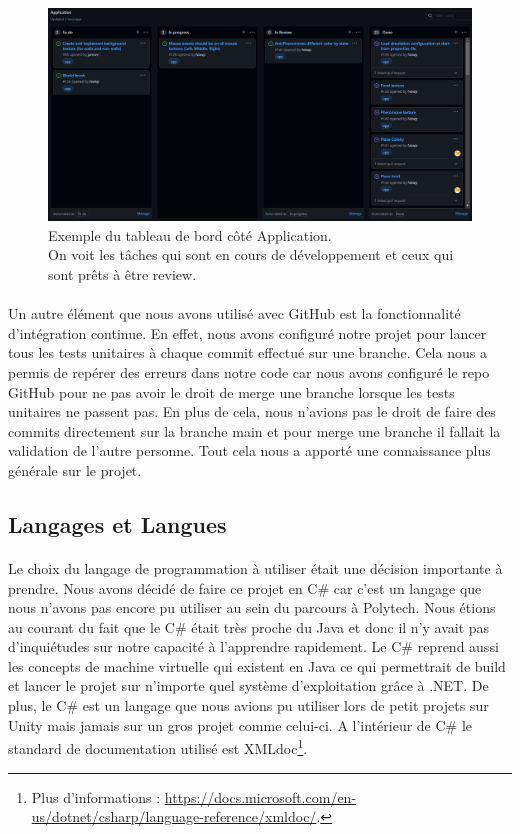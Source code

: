 \documentclass{EPUProjetDi}
\begin{document}
\begin{figure}[h]
\centering
\includegraphics[scale=.3]{kanban.png}
\caption{Exemple du tableau de bord côté Application. 
\\On voit les tâches qui sont en cours de développement et ceux qui sont prêts à être review.}
\label{fig:Kanban}
\end{figure}

\paragraph{}
Un autre élément que nous avons utilisé avec GitHub est la fonctionnalité d'intégration continue. En effet, nous avons configuré notre projet 
pour lancer tous les tests unitaires à chaque commit effectué sur une branche.
Cela nous a permis de repérer des erreurs dans notre code car nous avons configuré le repo GitHub pour ne pas avoir le droit de merge une branche lorsque les tests unitaires ne passent pas.
En plus de cela, nous n'avions pas le droit de faire des commits directement sur la branche main et pour merge une branche il fallait la validation de l'autre personne.
Tout cela nous a apporté une connaissance plus générale sur le projet.

\subsection{Langages et Langues}

\paragraph{}
Le choix du langage de programmation à utiliser était une décision importante à prendre. Nous avons décidé de faire ce projet en C\# car c'est un langage que nous
n'avons pas encore pu utiliser au sein du parcours à Polytech. Nous étions au courant du fait que le C\# était très proche du Java et donc il n'y avait pas
d'inquiétudes sur notre capacité à l'apprendre rapidement. Le C\# reprend aussi les concepts de machine virtuelle qui existent en Java ce qui permettrait de build et lancer le projet
sur n'importe quel système d'exploitation grâce à .NET.
De plus, le C\# est un langage que nous avions pu utiliser lors de petit projets sur Unity mais jamais sur un gros projet comme celui-ci. 
A l'intérieur de C\# le standard de documentation utilisé est XMLdoc\footnote{Plus d'informations : 
\url{https://docs.microsoft.com/en-us/dotnet/csharp/language-reference/xmldoc/}.}.
\end{document}
